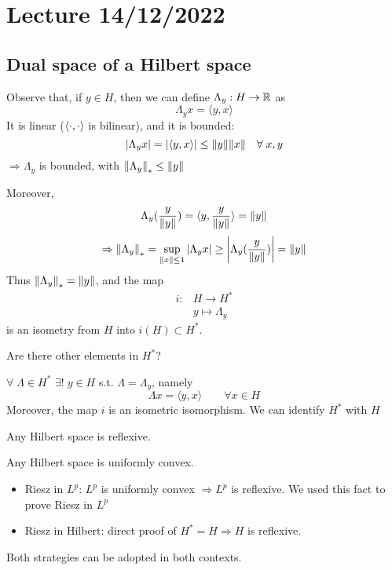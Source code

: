 \section{Lecture 14/12/2022}

\subsection*{Dual space of a Hilbert space}
Observe that, if \(y \in H\), then we can define \(\Lambda_y : H \to \mathbb{R}\) as
\[
    \Lambda_y x = \langle y, x\rangle  
\]
It is linear (\(\langle \cdot,\cdot \rangle   \) is bilinear), and it is bounded: 
\[
    \abs{\Lambda_y x}= \abs{\langle y, x\rangle  } \leq \norm{y} \norm{x} \quad \forall\; x, y
\]
\(\Rightarrow \Lambda_y\) is bounded, with \(\norm{\Lambda_y}_* \leq \norm{y}\)

Moreover, 
\[
    \Lambda_y (\frac{y}{\norm{y}}) = \langle y, \frac{y}{\norm{y}}\rangle   = \norm{y}
\]
\[
    \Rightarrow \norm{\Lambda_y}_* = \sup_{\norm{x} \leq 1} \abs{\Lambda_y x} \geq \abs{\Lambda_y (\frac{y}{\norm{y}})} = \norm{y}
\]
Thus \( \norm{\Lambda_y}_* = \norm{y}\), and the map 
\[
    \begin{array}{rl}
        i: & H \to H^* \\
        & y \mapsto \Lambda_y    
    \end{array}
\]
is an isometry from \(H\) into \(i(H) \subset {H^*}\).

Are there other elements in \(H^*\)?

\begin{theorem}
    \(\forall \; \Lambda \in H^* \) \(\exists! \; y \in H\) s.t. \(\Lambda = \Lambda_y\), namely
    \[
        \Lambda x = \langle y, x\rangle   \qquad \forall x \in H
    \]
    Moreover, the map \(i\) is an isometric isomorphism. We can identify \(H^*\) with \(H\)
\end{theorem}

\begin{corollary}
    Any Hilbert space is reflexive. 
\end{corollary}
\begin{remark}
    Any Hilbert space is uniformly convex.
\end{remark}

\begin{itemize}
    \item Riesz in \(L^p\): \(L^p \) is uniformly convex \(\Rightarrow L^p\) is reflexive. We used this fact to prove Riesz in \(L^p\)
    \item Riesz in Hilbert: direct proof of \(H^* = H \Rightarrow H\) is reflexive.
\end{itemize}
Both strategies can be adopted in both contexts.

